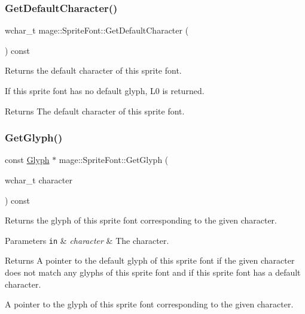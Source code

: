 \subsubsection{\texorpdfstring{Get\+Default\+Character()}{GetDefaultCharacter()}}
{\footnotesize\ttfamily wchar\+\_\+t mage\+::\+Sprite\+Font\+::\+Get\+Default\+Character (\begin{DoxyParamCaption}{ }\end{DoxyParamCaption}) const}

Returns the default character of this sprite font.

If this sprite font has no default glyph, {\ttfamily L\textquotesingle{}0\textquotesingle{}} is returned.

\begin{DoxyReturn}{Returns}
The default character of this sprite font. 
\end{DoxyReturn}
\hypertarget{classmage_1_1_sprite_font_aa13424a1e0153ffb9433bb2cb416360b}{}\label{classmage_1_1_sprite_font_aa13424a1e0153ffb9433bb2cb416360b} 
\subsubsection{\texorpdfstring{Get\+Glyph()}{GetGlyph()}}
{\footnotesize\ttfamily const \hyperlink{structmage_1_1_glyph}{Glyph} $\ast$ mage\+::\+Sprite\+Font\+::\+Get\+Glyph (\begin{DoxyParamCaption}\item[{wchar\+\_\+t}]{character }\end{DoxyParamCaption}) const}

Returns the glyph of this sprite font corresponding to the given character.


\begin{DoxyParams}[1]{Parameters}
\mbox{\tt in}  & {\em character} & The character. \\
\hline
\end{DoxyParams}
\begin{DoxyReturn}{Returns}
A pointer to the default glyph of this sprite font if the given character does not match any glyphs of this sprite font and if this sprite font has a default character. 

A pointer to the glyph of this sprite font corresponding to the given character. 
\end{DoxyReturn}

